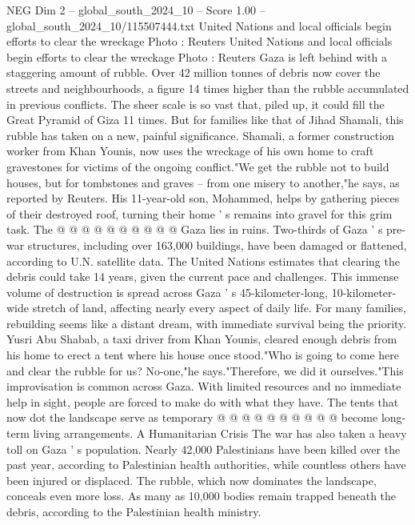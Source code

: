 \begin{textsample}{NEG Dim 2 – global\_south\_2024\_10 – Score 1.00 – global\_south\_2024\_10/115507444.txt}  \label{ex:f2_neg_419}
United Nations and local officials begin efforts to clear the wreckage Photo : Reuters United Nations and local officials begin efforts to clear the wreckage Photo : Reuters Gaza is left behind with a staggering amount of rubble.
Over 42 million tonnes of debris now cover the streets and neighbourhoods, a figure 14 times higher than the rubble accumulated in previous conflicts.
The sheer scale is so vast that, piled up, it could fill the Great Pyramid of Giza 11 times.
But for families like that of Jihad Shamali, this rubble has taken on a new, painful significance.
Shamali, a former construction worker from Khan Younis, now uses the wreckage of his own home to craft gravestones for victims of the ongoing conflict."We get the rubble not to build houses, but for tombstones and graves -- from one misery to another,"he says, as reported by Reuters.
His 11-year-old son, Mohammed, helps by gathering pieces of their destroyed roof, turning their home ' s remains into gravel for this grim task.
The @ @ @ @ @ @ @ @ @ @ Gaza lies in ruins.
Two-thirds of Gaza ' s pre-war structures, including over 163,000 buildings, have been damaged or flattened, according to U.N. satellite data.
The United Nations estimates that clearing the debris could take 14 years, given the current pace and challenges.
This immense volume of destruction is spread across Gaza ' s 45-kilometer-long, 10-kilometer-wide stretch of land, affecting nearly every aspect of daily life.
For many families, rebuilding seems like a distant dream, with immediate survival being the priority.
Yusri Abu Shabab, a taxi driver from Khan Younis, cleared enough debris from his home to erect a tent where his house once stood."Who is going to come here and clear the rubble for us?
No-one,"he says."Therefore, we did it ourselves."This improvisation is common across Gaza.
With limited resources and no immediate help in sight, people are forced to make do with what they have.
The tents that now dot the landscape serve as temporary @ @ @ @ @ @ @ @ @ @ become long-term living arrangements.
A Humanitarian Crisis The war has also taken a heavy toll on Gaza ' s population.
Nearly 42,000 Palestinians have been killed over the past year, according to Palestinian health authorities, while countless others have been injured or displaced.
The rubble, which now dominates the landscape, conceals even more loss.
As many as 10,000 bodies remain trapped beneath the debris, according to the Palestinian health ministry.

\end{textsample}

